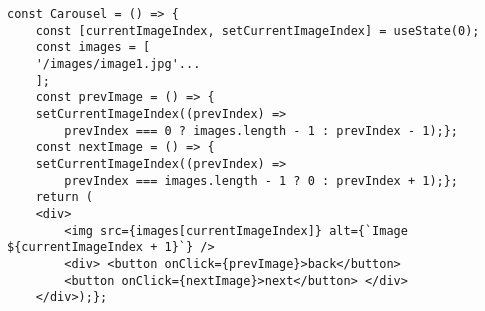 \documentclass{article}
\begin{document}
\begin{lstlisting}[frame=single, basicstyle=\ttfamily, breaklines=true, breakatwhitespace=true, postbreak=\mbox{\textcolor{red}{$\hookrightarrow$}\space}]
const Carousel = () => {
    const [currentImageIndex, setCurrentImageIndex] = useState(0);
    const images = [
    '/images/image1.jpg'...
    ];
    const prevImage = () => {
    setCurrentImageIndex((prevIndex) =>
        prevIndex === 0 ? images.length - 1 : prevIndex - 1);};
    const nextImage = () => {
    setCurrentImageIndex((prevIndex) =>
        prevIndex === images.length - 1 ? 0 : prevIndex + 1);};
    return (
    <div>
        <img src={images[currentImageIndex]} alt={`Image ${currentImageIndex + 1}`} />
        <div> <button onClick={prevImage}>back</button>
        <button onClick={nextImage}>next</button> </div>
    </div>);};
    
\end{lstlisting}
\end{document}
